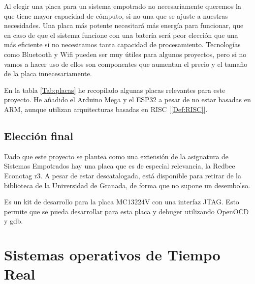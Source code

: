 Al elegir una placa para un sistema empotrado no necesariamente queremos la que tiene mayor capacidad de cómputo, si no una que se ajuste a nuestras necesidades. Una placa más potente necesitará más energía para funcionar, que en caso de que el sistema funcione con una batería será peor elección que una más eficiente si no necesitamos tanta capacidad de procesamiento. Tecnologías como Bluetooth y Wifi pueden ser muy útiles para algunos proyectos, pero si no vamos a hacer uso de ellos son componentes que aumentan el precio y el tamaño de la placa innecesariamente.

En la tabla \ref{Tab:placas} he recopilado algunas placas relevantes para este proyecto. He añadido el Arduino Mega y el ESP32 a pesar de no estar basadas en ARM, aunque utilizan arquitecturas basadas en RISC [\ref{Def:RISC}].



\subsection{Elección final}
Dado que este proyecto se plantea como una extensión de la asignatura de Sistemas Empotrados hay una placa que es de especial relevancia, la Redbee Econotag r3. A pesar de estar descatalogada, está disponible para retirar de la biblioteca de la Universidad de Granada, de forma que no supone un desembolso.

Es un kit de desarrollo para la placa MC13224V con una interfaz JTAG. Esto permite que se pueda desarrollar para esta placa y debuger utilizando OpenOCD y gdb.

\section{Sistemas operativos de Tiempo Real}

